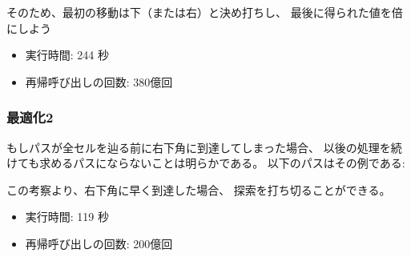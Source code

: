 そのため、最初の移動は下（または右）と決め打ちし、
最後に得られた値を倍にしよう

\begin{itemize}
\item
実行時間: 244 秒
\item
再帰呼び出しの回数: 380億回
\end{itemize}

\begin{comment}
\subsubsection{Optimization 2}

If the path reaches the lower-right square
before it has visited all other squares of the grid,
it is clear that
it will not be possible to complete the solution.
An example of this is the following path:
\end{comment}

\subsubsection{最適化2}

もしパスが全セルを辿る前に右下角に到達してしまった場合、
以後の処理を続けても求めるパスにならないことは明らかである。
以下のパスはその例である:

\begin{center}
\end{center}

\begin{comment}
Using this observation, we can terminate the search
immediately if we reach the lower-right square too early.
\begin{itemize}
\item
running time: 119 seconds
\item
number of recursive calls: 20 billion
\end{itemize}
\end{comment}

この考察より、右下角に早く到達した場合、
探索を打ち切ることができる。
\begin{itemize}
\item
実行時間: 119 秒
\item
再帰呼び出しの回数: 200億回
\end{itemize}

